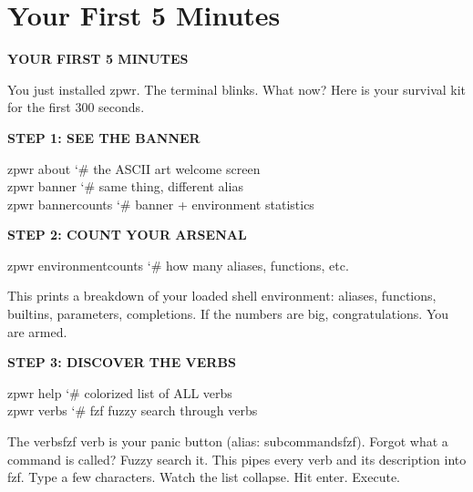 \documentclass[11pt,a4paper,twoside]{book}
\begin{document}
\section{Your First 5 Minutes}


\vspace{10pt}
{\large\bfseries\color{neoncyan} YOUR FIRST 5 MINUTES}\vspace{6pt}

You just installed zpwr. The terminal blinks. What now? Here is your survival kit for the first 300 seconds.


\vspace{12pt}
{\bfseries\color{neonyellow} STEP 1: SEE THE BANNER}\vspace{4pt}

\begin{codebox}
\color{neongreen}zpwr about              {\char`\#} the ASCII art welcome screen\\
\color{neongreen}zpwr banner             {\char`\#} same thing, different alias\\
\color{neongreen}zpwr bannercounts       {\char`\#} banner + environment statistics\\
\end{codebox}


\vspace{12pt}
{\bfseries\color{neonyellow} STEP 2: COUNT YOUR ARSENAL}\vspace{4pt}

\begin{codebox}
\color{neongreen}zpwr environmentcounts  {\char`\#} how many aliases, functions, etc.\\
\end{codebox}

This prints a breakdown of your loaded shell environment: aliases, functions, builtins, parameters, completions. If the numbers are big, congratulations. You are armed.


\vspace{12pt}
{\bfseries\color{neonyellow} STEP 3: DISCOVER THE VERBS}\vspace{4pt}

\begin{codebox}
\color{neongreen}zpwr help               {\char`\#} colorized list of ALL verbs\\
\color{neongreen}zpwr verbs     {\char`\#} fzf fuzzy search through verbs\\
\end{codebox}

The verbsfzf verb is your panic button (alias: subcommandsfzf). Forgot what a command is called? Fuzzy search it. This pipes every verb and its description into fzf. Type a few characters. Watch the list collapse. Hit enter. Execute.
\end{document}
